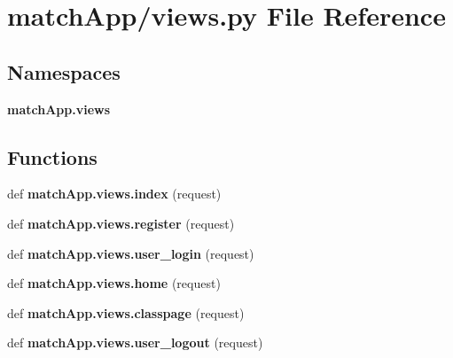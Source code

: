 \section{match\+App/views.py File Reference}
\label{views_8py}
\subsection*{Namespaces}
\begin{DoxyCompactItemize}
\item 
 {\bf match\+App.\+views}
\end{DoxyCompactItemize}
\subsection*{Functions}
\begin{DoxyCompactItemize}
\item 
def {\bf match\+App.\+views.\+index} (request)
\item 
def {\bf match\+App.\+views.\+register} (request)
\item 
def {\bf match\+App.\+views.\+user\+\_\+login} (request)
\item 
def {\bf match\+App.\+views.\+home} (request)
\item 
def {\bf match\+App.\+views.\+classpage} (request)
\item 
def {\bf match\+App.\+views.\+user\+\_\+logout} (request)
\end{DoxyCompactItemize}
